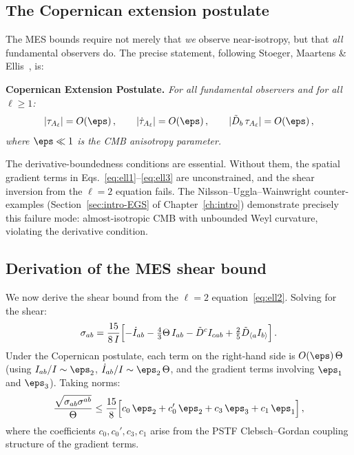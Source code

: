 \subsection{The Copernican extension postulate}
\label{sec:copernican}

The MES bounds require not merely that \emph{we} observe
near-isotropy, but that \emph{all} fundamental observers do.
The precise statement, following Stoeger, Maartens \&
Ellis~\cite{StoegerME1995}, is:

\medskip
\noindent\textbf{Copernican Extension Postulate.}\quad
\textit{For all fundamental observers and for all $\ell \geq 1$:
\begin{equation}\label{eq:copernican}
|\tau_{A_\ell}| = O(\eps)\,,\qquad
|\dot{\tau}_{A_\ell}| = O(\eps)\,,\qquad
|\tilde{D}_b\,\tau_{A_\ell}| = O(\eps)\,,
\end{equation}
where $\eps \ll 1$ is the CMB anisotropy parameter.}
\medskip

The derivative-boundedness conditions are essential.  Without
them, the spatial gradient terms in
Eqs.~\eqref{eq:ell1}--\eqref{eq:ell3} are unconstrained, and
the shear inversion from the $\ell = 2$ equation fails.  The
Nilsson--Uggla--Wainwright counter-examples
(Section~\ref{sec:intro-EGS} of Chapter~\ref{ch:intro})
demonstrate precisely this failure mode: almost-isotropic CMB
with unbounded Weyl curvature, violating the derivative
condition.


\subsection{Derivation of the MES shear bound}
\label{sec:MES-shear-derivation}

We now derive the shear bound from the $\ell = 2$
equation~\eqref{eq:ell2}.  Solving for the shear:
\begin{equation}\label{eq:sigma-from-ell2}
\sigma_{ab}
= \frac{15}{8\,I}\Bigl[
  -\dot{I}_{ab} - \tfrac{4}{3}\Theta\,I_{ab}
  - \tilde{D}^c I_{cab}
  + \tfrac{2}{5}\tilde{D}_{\langle a} I_{b\rangle}
\Bigr]\,.
\end{equation}
Under the Copernican postulate, each term on the right-hand
side is $O(\eps)\,\Theta$ (using $I_{ab}/I \sim \eps_2$,
$\dot{I}_{ab}/I \sim \eps_2\,\Theta$, and the gradient
terms involving $\eps_1$ and $\eps_3$).  Taking norms:
\begin{equation}\label{eq:sigma-bound-raw}
\frac{\sqrt{\sigma_{ab}\sigma^{ab}}}{\Theta}
\leq \frac{15}{8}\Bigl[
  c_0\,\eps_2 + c_0'\,\eps_2
  + c_3\,\eps_3 + c_1\,\eps_1
\Bigr]\,,
\end{equation}
where the coefficients $c_0, c_0', c_3, c_1$ arise from the
PSTF Clebsch--Gordan coupling structure of the gradient terms.

